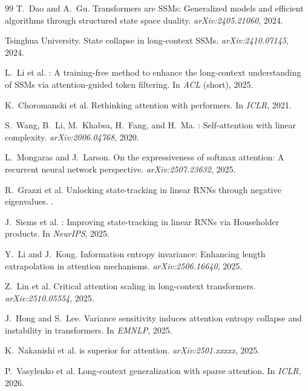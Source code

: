 \documentclass[11pt,a4paper]{article}
\theoremstyle{remark}
\begin{document}
\begin{thebibliography}{99}
T.~Dao and A.~Gu.
\newblock Transformers are {SSMs}: Generalized models and efficient algorithms through structured state space duality.
\newblock \emph{arXiv:2405.21060}, 2024.

Tsinghua University.
\newblock State collapse in long-context {SSMs}.
\newblock \emph{arXiv:2410.07145}, 2024.

L.~Li et al.
: A training-free method to enhance the long-context understanding of {SSMs} via attention-guided token filtering.
\newblock In \emph{ACL} (short), 2025.

K.~Choromanski et al.
\newblock Rethinking attention with performers.
\newblock In \emph{ICLR}, 2021.

S.~Wang, B.~Li, M.~Khabsa, H.~Fang, and H.~Ma.
: Self-attention with linear complexity.
\newblock \emph{arXiv:2006.04768}, 2020.

L.~Mongaras and J.~Larson.
\newblock On the expressiveness of softmax attention: A recurrent neural network perspective.
\newblock \emph{arXiv:2507.23632}, 2025.

R.~Grazzi et al.
\newblock Unlocking state-tracking in linear {RNNs} through negative eigenvalues.
.

J.~Siems et al.
: Improving state-tracking in linear {RNNs} via {Householder} products.
\newblock In \emph{NeurIPS}, 2025.

Y.~Li and J.~Kong.
\newblock Information entropy invariance: Enhancing length extrapolation in attention mechanisms.
\newblock \emph{arXiv:2506.16640}, 2025.

Z.~Lin et al.
\newblock Critical attention scaling in long-context transformers.
\newblock \emph{arXiv:2510.05554}, 2025.

J.~Hong and S.~Lee.
\newblock Variance sensitivity induces attention entropy collapse and instability in transformers.
\newblock In \emph{EMNLP}, 2025.

K.~Nakanishi et al.
 is superior for attention.
\newblock \emph{arXiv:2501.xxxxx}, 2025.

P.~Vasylenko et al.
\newblock Long-context generalization with sparse attention.
\newblock In \emph{ICLR}, 2026.


\end{thebibliography}
\end{document}
